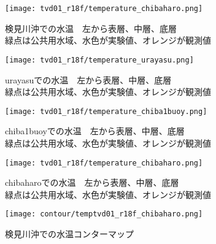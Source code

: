 \documentclass[fontsize=12pt,paper=a4]{jlreq}
\begin{document}
\begin{figure}[hbtp]
        \centering
        \texttt{[image: tvd01\_r18f/temperature\_chibaharo.png]}
        \caption{検見川沖での水温　左から表層、中層、底層\\緑点は公共用水域、水色が実験値、オレンジが観測値}
\end{figure}
\begin{figure}[hbtp]
  \centering
  \texttt{[image: tvd01\_r18f/temperature\_urayasu.png]}
  \caption{urayasuでの水温　左から表層、中層、底層\\緑点は公共用水域、水色が実験値、オレンジが観測値}
\end{figure}

\begin{figure}[hbtp]
  \centering
  \texttt{[image: tvd01\_r18f/temperature\_chiba1buoy.png]}
  \caption{chiba1buoyでの水温　左から表層、中層、底層\\緑点は公共用水域、水色が実験値、オレンジが観測値}
\end{figure}

\begin{figure}[hbtp]
  \centering
  \texttt{[image: tvd01\_r18f/temperature\_chibaharo.png]}
  \caption{chibaharoでの水温　左から表層、中層、底層\\緑点は公共用水域、水色が実験値、オレンジが観測値}
\end{figure}


\begin{figure}[hbtp]
    \centering
    \texttt{[image: contour/temptvd01\_r18f\_chibaharo.png]}
    \caption{検見川沖での水温コンターマップ}
\end{figure}
\end{document}
